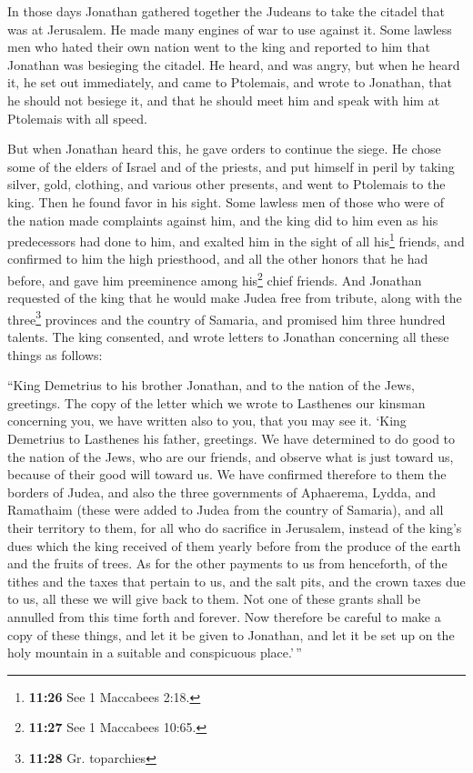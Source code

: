  In those days Jonathan gathered together the Judeans to
take the citadel that was at Jerusalem. He made many engines of war to
use against it.  Some lawless men who hated their own
nation went to the king and reported to him that Jonathan was besieging
the citadel.  He heard, and was angry, but when he heard
it, he set out immediately, and came to Ptolemais, and wrote to
Jonathan, that he should not besiege it, and that he should meet him and
speak with him at Ptolemais with all speed.

 But when Jonathan heard this, he gave orders to continue
the siege. He chose some of the elders of Israel and of the priests, and
put himself in peril  by taking silver, gold, clothing,
and various other presents, and went to Ptolemais to the king. Then he
found favor in his sight.  Some lawless men of those who
were of the nation made complaints against him,  and the
king did to him even as his predecessors had done to him, and exalted
him in the sight of all his\footnote{\textbf{11:26} See 1 Maccabees
  2:18.} friends,  and confirmed to him the high
priesthood, and all the other honors that he had before, and gave him
preeminence among his\footnote{\textbf{11:27} See 1 Maccabees 10:65.}
chief friends.  And Jonathan requested of the king that
he would make Judea free from tribute, along with the three\footnote{\textbf{11:28}
  Gr. toparchies} provinces and the country of Samaria, and promised him
three hundred talents.  The king consented, and wrote
letters to Jonathan concerning all these things as follows:

 ``King Demetrius to his brother Jonathan, and to the
nation of the Jews, greetings.  The copy of the letter
which we wrote to Lasthenes our kinsman concerning you, we have written
also to you, that you may see it.  `King Demetrius to
Lasthenes his father, greetings.  We have determined to
do good to the nation of the Jews, who are our friends, and observe what
is just toward us, because of their good will toward us. 
We have confirmed therefore to them the borders of Judea, and also the
three governments of Aphaerema, Lydda, and Ramathaim (these were added
to Judea from the country of Samaria), and all their territory to them,
for all who do sacrifice in Jerusalem, instead of the king's dues which
the king received of them yearly before from the produce of the earth
and the fruits of trees.  As for the other payments to us
from henceforth, of the tithes and the taxes that pertain to us, and the
salt pits, and the crown taxes due to us, all these we will give back to
them.  Not one of these grants shall be annulled from
this time forth and forever.  Now therefore be careful to
make a copy of these things, and let it be given to Jonathan, and let it
be set up on the holy mountain in a suitable and conspicuous place.'\,''

